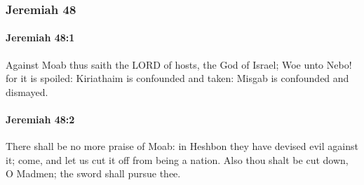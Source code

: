 	\subsubsection{Jeremiah 48} %
		\label{JEREMIAH-48}

		\paragraph{Jeremiah 48:1} %
			\label{JEREMIAH-48-1}

			Against Moab thus saith the LORD of hosts, the God of Israel; Woe unto Nebo! for it is spoiled: Kiriathaim is confounded and taken: Misgab is confounded and dismayed.


		\paragraph{Jeremiah 48:2} %
			\label{JEREMIAH-48-2}

			There shall be no more praise of Moab: in Heshbon they have devised evil against it; come, and let us cut it off from being a nation. Also thou shalt be cut down, O Madmen; the sword shall pursue thee.

